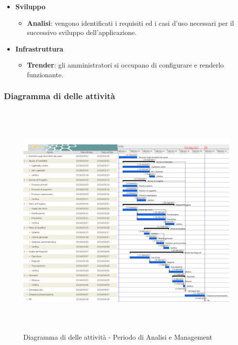\begin{itemize}
\begin{itemize}
		\end{itemize}
		\item \textbf{Sviluppo}
		\att
			\begin{itemize}
				\item \textbf{Analisi}: vengono identificati i requisiti ed i casi d'uso necessari per il successivo sviluppo dell'applicazione.
			\end{itemize}
		\item \textbf{Infrastruttura}
		\att 
		\begin{itemize}
			\item \textbf{Trender}: gli amministratori si occupano di configurare  e renderlo funzionante.
		\end{itemize}
	\end{itemize}
	
		
		\subsubsection{Diagramma di  delle attività}
		
		\begin{figure}[!h]
			\centering
			\includegraphics[height=12cm, width=15cm]{img/gantt/A} 
			\caption{Diagramma di  delle attività - Periodo di Analisi e Management}
		\end{figure}
		
